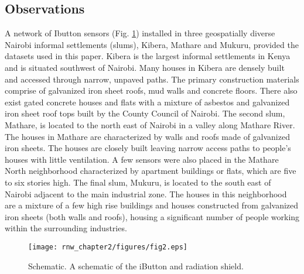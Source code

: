 \subsection{Observations}
A network of Ibutton sensors (Fig. \ref{schematic}) installed in three geospatially diverse Nairobi informal settlements (slums), Kibera, Mathare and Mukuru, provided the datasets used in this paper. Kibera is the largest informal settlements in Kenya and is situated southwest of Nairobi. Many houses in Kibera are densely built and accessed through narrow, unpaved paths. The primary construction materials comprise of galvanized iron sheet roofs, mud walls and concrete floors. There also exist gated concrete houses and flats with a mixture of asbestos and galvanized iron sheet roof tops built by the County Council of Nairobi. The second slum, Mathare, is located to the north east of Nairobi in a valley along Mathare River. The houses in Mathare are characterized by walls and roofs made of galvanized iron sheets. The houses are closely built leaving narrow access paths to people's houses with little ventilation. A few sensors were also placed in the Mathare North neighborhood characterized by apartment buildings or flats, which are five to six stories high. The final slum, Mukuru, is located to the south east of Nairobi adjacent to the main industrial zone. The houses in this neighborhood are a mixture of a few high rise buildings and houses constructed from galvanized iron sheets (both walls and roofs), housing a significant number of people working within the surrounding industries.
\begin{figure}[!h]
\texttt{[image: rnw\_chapter2/figures/fig2.eps]}
\caption{Schematic. A schematic of the iButton and radiation shield.}
\label{schematic}
\end{figure}

